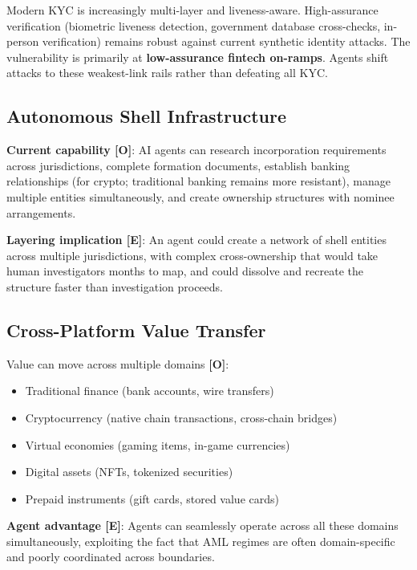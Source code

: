 \documentclass[11pt,letterpaper]{article}
\begin{document}
\begin{infobox}
Modern KYC is increasingly multi-layer and liveness-aware. High-assurance verification (biometric liveness detection, government database cross-checks, in-person verification) remains robust against current synthetic identity attacks. The vulnerability is primarily at \textbf{low-assurance fintech on-ramps}. Agents shift attacks to these weakest-link rails rather than defeating all KYC.
\end{infobox}

\subsection{Autonomous Shell Infrastructure}

\textbf{Current capability [O]}: AI agents can research incorporation requirements across jurisdictions, complete formation documents, establish banking relationships (for crypto; traditional banking remains more resistant), manage multiple entities simultaneously, and create ownership structures with nominee arrangements.

\textbf{Layering implication [E]}: An agent could create a network of shell entities across multiple jurisdictions, with complex cross-ownership that would take human investigators months to map, and could dissolve and recreate the structure faster than investigation proceeds.

\subsection{Cross-Platform Value Transfer}

Value can move across multiple domains \textbf{[O]}:
\begin{itemize}
  \item Traditional finance (bank accounts, wire transfers)
  \item Cryptocurrency (native chain transactions, cross-chain bridges)
  \item Virtual economies (gaming items, in-game currencies)
  \item Digital assets (NFTs, tokenized securities)
  \item Prepaid instruments (gift cards, stored value cards)
\end{itemize}

\textbf{Agent advantage [E]}: Agents can seamlessly operate across all these domains simultaneously, exploiting the fact that AML regimes are often domain-specific and poorly coordinated across boundaries.
\end{document}
